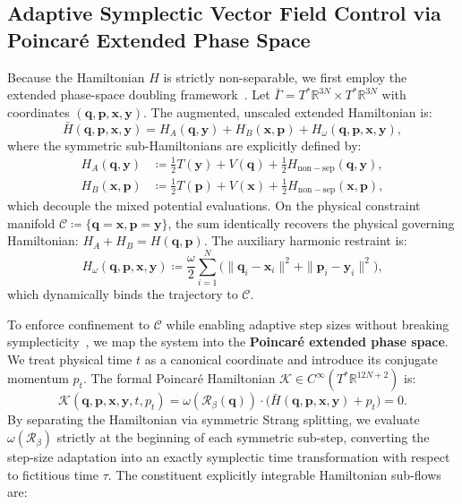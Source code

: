 \documentclass[11pt,a4paper,reqno]{article}
\theoremstyle{plain}
\theoremstyle{definition}
\theoremstyle{remark}
\numberwithin{equation}{section}
\begin{document}
\subsection{Adaptive Symplectic Vector Field Control via Poincaré Extended Phase Space}
Because the Hamiltonian $H$ is strictly non-separable, we first employ the extended phase-space doubling framework~\cite{Tao2016}. Let $\bar{\Gamma} = T^*\mathbb{R}^{3N} \times T^*\mathbb{R}^{3N}$ with coordinates $(\bm{q}, \bm{p}, \bm{x}, \bm{y})$. The augmented, unscaled extended Hamiltonian is:
\begin{equation}
\bar{H}(\bm{q}, \bm{p}, \bm{x}, \bm{y}) = H_A(\bm{q}, \bm{y}) + H_B(\bm{x}, \bm{p}) + H_\omega(\bm{q}, \bm{p}, \bm{x}, \bm{y}),
\label{eq:extended_hamiltonian}
\end{equation}
where the symmetric sub-Hamiltonians are explicitly defined by:
\begin{align}
H_A(\bm{q}, \bm{y}) &\coloneqq \frac{1}{2} T(\bm{y}) + V(\bm{q}) + \frac{1}{2} H_{\mathrm{non-sep}}(\bm{q}, \bm{y}), \label{eq:sub_ha} \\
H_B(\bm{x}, \bm{p}) &\coloneqq \frac{1}{2} T(\bm{p}) + V(\bm{x}) + \frac{1}{2} H_{\mathrm{non-sep}}(\bm{x}, \bm{p}), \label{eq:sub_hb}
\end{align}
which decouple the mixed potential evaluations. On the physical constraint manifold $\mathcal{C} \coloneqq \{\bm{q}=\bm{x}, \bm{p}=\bm{y}\}$, the sum identically recovers the physical governing Hamiltonian: $H_A + H_B = H(\bm{q}, \bm{p})$. The auxiliary harmonic restraint is:
\begin{equation}
H_\omega(\bm{q}, \bm{p}, \bm{x}, \bm{y}) \coloneqq \frac{\omega}{2} \sum_{i=1}^N \Big( \|\bm{q}_i - \bm{x}_i\|^2 + \|\bm{p}_i - \bm{y}_i\|^2 \Big),
\end{equation}
which dynamically binds the trajectory to $\mathcal{C}$.

To enforce confinement to $\mathcal{C}$ while enabling adaptive step sizes without breaking symplecticity~\cite{HairerLubichWanner2006}, we map the system into the \textbf{Poincaré extended phase space}. We treat physical time $t$ as a canonical coordinate and introduce its conjugate momentum $p_t$. The formal Poincaré Hamiltonian $\mathcal{K} \in C^\infty(T^*\mathbb{R}^{12N+2})$ is:
\begin{equation}
\mathcal{K}(\bm{q}, \bm{p}, \bm{x}, \bm{y}, t, p_t) = \omega(\mathcal{R}_\beta(\bm{q})) \cdot \Big( \bar{H}(\bm{q}, \bm{p}, \bm{x}, \bm{y}) + p_t \Big) = 0.
\label{eq:poincare_K}
\end{equation}
By separating the Hamiltonian via symmetric Strang splitting, we evaluate $\omega(\mathcal{R}_\beta)$ strictly at the beginning of each symmetric sub-step, converting the step-size adaptation into an exactly symplectic time transformation with respect to fictitious time $\tau$. The constituent explicitly integrable Hamiltonian sub-flows are:
\end{document}
